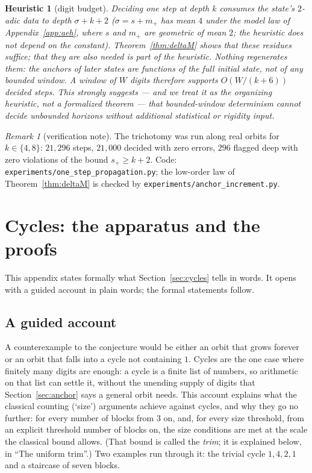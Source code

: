 \documentclass[11pt]{article}
\newtheorem{heuristic}[theorem]{Heuristic}
\theoremstyle{remark}
\newtheorem{remark}[theorem]{Remark}
\begin{document}
\begin{heuristic}[digit budget]\label{prop:budget}
Deciding one step at depth $k$ consumes the state's $2$-adic data to depth $\sigma + k + 2$ ($\sigma = s + m_+$ has mean $4$ under the model law of Appendix~\ref{app:aeh}, where $s$ and $m_+$ are geometric of mean $2$; the heuristic does not depend on the constant). Theorem~\ref{thm:deltaM} shows that these residues suffice; that they are also needed is part of the heuristic. Nothing regenerates them: the anchors of later states are functions of the full initial state, not of any bounded window. A window of $W$ digits therefore supports $O(W/(k+6))$ decided steps. This strongly suggests --- and we treat it as the organizing heuristic, not a formalized theorem --- that bounded-window determinism cannot decide unbounded horizons without additional statistical or rigidity input.
\end{heuristic}

\begin{remark}[verification note]\label{rem:verify2}
The trichotomy was run along real orbits for $k \in \{4,8\}$: $21{,}296$ steps, $21{,}000$ decided with zero errors, $296$ flagged deep with zero violations of the bound $s_+ \ge k+2$. Code: \texttt{experiments/one\_step\_propagation.py}; the low-order law of Theorem~\ref{thm:deltaM} is checked by \texttt{experiments/anchor\_increment.py}.
\end{remark}

\section{Cycles: the apparatus and the proofs}\label{app:cycles}

This appendix states formally what Section~\ref{sec:cycles} tells in words. It opens with a guided account in plain words; the formal statements follow.

\subsection*{A guided account}

A counterexample to the conjecture would be either an orbit that grows forever or an orbit that falls into a cycle not containing $1$. Cycles are the one case where finitely many digits are enough: a cycle is a finite list of numbers, so arithmetic on that list can settle it, without the unending supply of digits that Section~\ref{sec:anchor} says a general orbit needs. This account explains what the classical counting (`size') arguments achieve against cycles, and why they go no further: for every number of blocks from $3$ on, and, for every size threshold, from an explicit threshold number of blocks on, the size conditions are met at the scale the classical bound allows. (That bound is called the \emph{trim}; it is explained below, in ``The uniform trim''.) Two examples run through it: the trivial cycle $1, 4, 2, 1$ and a staircase of seven blocks.
\end{document}
